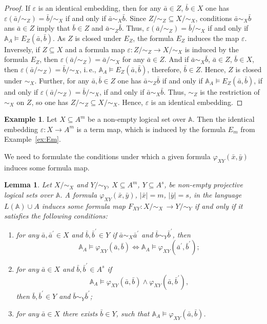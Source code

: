 \documentclass[12pt]{article}
\newtheorem{lemma}{Lemma}
\theoremstyle{definition}
\newtheorem{example}{Example}
\def\MA{{\mathbb{A}}}
\begin{document}
\begin{proof}
If $\varepsilon$ is an identical embedding, then for any $\bar a\in Z$, $\bar b\in X$ one has $\varepsilon(\bar a/{\sim_Z})=\bar b/{\sim_X}$ if and only if $\bar a\sim_X\bar b$. Since $Z/{\sim_Z}\subseteq X/{\sim_X}$, conditions $\bar a\sim_X\bar b$ ans $\bar a\in Z$ imply that $\bar b\in Z$ and $\bar a\sim_Z\bar b$. Thus, $\varepsilon(\bar a/{\sim_Z})=\bar b/{\sim_X}$ if and only if $\MA_A\models E_Z(\bar a,\bar b)$. As $Z$ is closed under $E_Z$, the formula $E_Z$ induces the map $\varepsilon$. Inversely, if $Z\subseteq X$ and a formula map $\varepsilon\colon Z/{\sim_Z}\to X/{\sim_X}$ is induced by the formula $E_Z$, then $\varepsilon (\bar a/{\sim_Z})=\bar a/{\sim_X}$ for any $\bar a\in Z$. And if $\bar a\sim_X\bar b$, $\bar a\in Z$, $\bar b\in X$, then $\varepsilon (\bar a/{\sim_Z})=\bar b/{\sim_X}$, i.\,e., $\MA_A\models E_Z(\bar a,\bar b)$, therefore, $\bar b \in Z$. Hence, $Z$ is closed under $\sim_X$. Further, for any $\bar a,\bar b\in Z$ one has $\bar a\sim_Z\bar b$ if and only if $\MA_A\models E_Z(\bar a,\bar b)$, if and only if $\varepsilon (\bar a/{\sim_Z})=\bar b/{\sim_X}$, if and only if $\bar a\sim_X\bar b$. Thus, $\sim_Z$ is the restriction of $\sim_X$ on $Z$, so one has $Z/{\sim_Z}\subseteq X/{\sim_X}$. Hence, $\varepsilon$ is an identical embedding.
\end{proof}

\begin{example}\label{ex:non-empty2}
Let $X\subseteq A^m$ be a non-empty logical set over $\MA$. Then the identical embedding $\varepsilon\colon X\to A^m$ is a term map, which is induced by the formula $E_m$ from Example~\ref{ex:Em}. 
\end{example}

We need to formulate the conditions under which a given formula $\varphi_{XY}(\bar x,\bar y)$ induces some formula map.

\begin{lemma}\label{fm}
Let $X/{\sim_X}$ and $Y/{\sim_Y}$, $X\subseteq A^m$, $Y\subseteq A^s$, be non-empty projective logical sets over $\MA$. A formula $\varphi_{XY}(\bar x,\bar y)$, $|\bar x|=m$, $|\bar y|=s$, in the language $L(\MA)\cup A$ induces some formula map $F_{XY}\colon X/{\sim_X} \,\to Y/{\sim_Y}$ if and only if it satisfies the following conditions:
\begin{enumerate}[label=(\roman*)]
\item\label{fm1} for any $\bar a, \bar a^\prime\in X$ and $\bar b, \bar b^\prime\in Y$ if $\bar a\sim_X\bar a^\prime$ and $\bar b\sim_Y \bar b^\prime$, then
$$
\MA_A\models \varphi_{XY}(\bar a,\bar b) \iff \MA_A\models \varphi_{XY}(\bar a^\prime,\bar b^\prime);
$$
\item\label{fm2} for any $\bar a\in X$ and $\bar b,\bar b^\prime\in A^s$ if
$$
\MA_A\models\varphi_{XY}(\bar a, \bar b)\wedge \varphi_{XY}(\bar a, \bar b^\prime),
$$
then $\bar b,\bar b^\prime\in Y$ and $\bar b\sim_Y \bar b^\prime$;
\item\label{fm3} for any $\bar a\in X$ there exists $\bar b\in Y$, such that $\MA_A\models\varphi_{XY}(\bar a, \bar b)$.
\end{enumerate}
\end{lemma}
\end{document}
